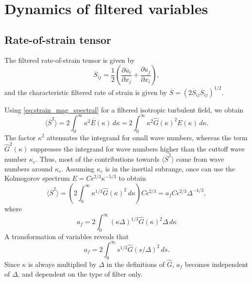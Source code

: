 \documentclass[oneside,a4paper,11pt]{report}
\newcommand{\ures}{\overline{u}}
\begin{document}
\section{Dynamics of filtered variables}

\subsection{Rate-of-strain tensor}
The filtered rate-of-strain tensor is given by
\begin{equation}
\overline{S}_{ij} = \frac{1}{2} \left ( \frac{\partial \ures_i}{\partial x_j} + \frac{\partial \ures_j}{\partial x_i} \right ),
\end{equation}
and the characteristic filtered rate of strain is given by $\overline{S} = \left ( 2 \overline{S}_{ij} \overline{S}_{ij} \right ) ^{1/2}$. 

Using \cref{eq:strain_mag_spectral} for a filtered isotropic turbulent field, we obtain
\begin{equation}
\langle \overline{S}^2 \rangle = 2 \int_0^\infty \kappa^2 \overline{E}(\kappa) \,d\kappa = 2 \int_0^\infty \kappa^2 \hat{G}(\kappa)^2 E(\kappa) \,d\kappa.
\end{equation}
The factor $\kappa^2$ attenuates the integrand for small wave numbers, whereas the term $\hat{G}^2(\kappa)$ suppresses the integrand for wave numbers higher than the cuttoff wave number $\kappa_c$. Thus, most of the contributions towards $\langle \overline{S}^2 \rangle$ come from wave numbers around $\kappa_c$. Assuming $\kappa_c$ is in the inertial subrange, once can use the Kolmogorov spectrum $E = C \epsilon^{2/3} \kappa^{-5/3}$ to obtain
\begin{equation}
\label{eq:S2_estimate}
\langle \overline{S}^2 \rangle = \left ( 2 \int_0^\infty \kappa^{1/3} \hat{G}(\kappa)^2 \,d\kappa \right ) C \epsilon^{2/3} = a_f C \epsilon^{2/3} \Delta^{-4/3},
\end{equation}
where 
\begin{equation}
a_f = 2 \int_0^\infty ( \kappa \Delta )^{1/3} \hat{G}(\kappa)^2 \Delta \, d\kappa 
\end{equation}
A transformation of variables reveals that
\begin{equation}
a_f = 2 \int_0^\infty s^{1/3} \hat{G} (s/\Delta )^2\, ds.
\end{equation}
Since $\kappa$ is always multiplied by $\Delta$ in the definitions of $\hat{G}$, $a_f$ becomes independent of $\Delta$, and dependent on the type of filter only.
\end{document}
